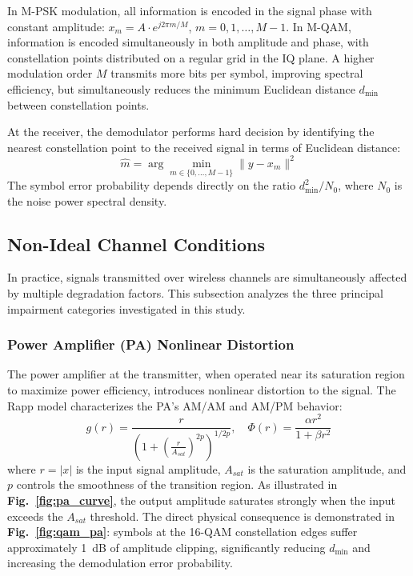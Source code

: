 \documentclass[a4paper,14pt]{extreport}
\begin{document}
In M-PSK modulation, all information is encoded in the signal phase with constant amplitude: $x_m = A \cdot e^{j2\pi m/M}$, $m = 0, 1, \ldots, M-1$. In M-QAM, information is encoded simultaneously in both amplitude and phase, with constellation points distributed on a regular grid in the IQ plane. A higher modulation order $M$ transmits more bits per symbol, improving spectral efficiency, but simultaneously reduces the minimum Euclidean distance $d_{\min}$ between constellation points.

At the receiver, the demodulator performs hard decision by identifying the nearest constellation point to the received signal in terms of Euclidean distance:
\begin{equation}
\hat{m} = \arg\min_{m \in \{0,\ldots,M-1\}} \| y - x_m \|^2
\end{equation}
The symbol error probability depends directly on the ratio $d_{\min}^2 / N_0$, where $N_0$ is the noise power spectral density.

\subsection{Non-Ideal Channel Conditions}

In practice, signals transmitted over wireless channels are simultaneously affected by multiple degradation factors. This subsection analyzes the three principal impairment categories investigated in this study.

\subsubsection{Power Amplifier (PA) Nonlinear Distortion}
The power amplifier at the transmitter, when operated near its saturation region to maximize power efficiency, introduces nonlinear distortion to the signal. The Rapp model characterizes the PA's AM/AM and AM/PM behavior:
\begin{equation}
g(r) = \frac{r}{\left(1 + \left(\frac{r}{A_{sat}}\right)^{2p}\right)^{1/2p}}, \quad \Phi(r) = \frac{\alpha r^2}{1 + \beta r^2}
\end{equation}
where $r = |x|$ is the input signal amplitude, $A_{sat}$ is the saturation amplitude, and $p$ controls the smoothness of the transition region. As illustrated in \textbf{Fig.~\ref{fig:pa_curve}}, the output amplitude saturates strongly when the input exceeds the $A_{sat}$ threshold. The direct physical consequence is demonstrated in \textbf{Fig.~\ref{fig:qam_pa}}: symbols at the 16-QAM constellation edges suffer approximately 1~dB of amplitude clipping, significantly reducing $d_{\min}$ and increasing the demodulation error probability.
\end{document}
